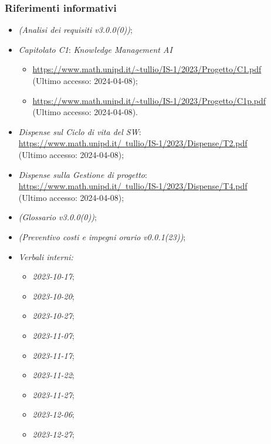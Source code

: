 \documentclass[10pt, a4paper]{article}
\begin{document}
\subsubsection{Riferimenti informativi}
\begin{itemize}
    \item \textit{(Analisi dei requisiti v3.0.0(0))};
    \item \textit{Capitolato C1}: \textit{Knowledge Management AI}
    \begin{itemize}
        \item \url{https://www.math.unipd.it/~tullio/IS-1/2023/Progetto/C1.pdf}\\
        (Ultimo accesso: 2024-04-08);
        \item \url{https://www.math.unipd.it/~tullio/IS-1/2023/Progetto/C1p.pdf}\\
        (Ultimo accesso: 2024-04-08).
    \end{itemize}
    \item \textit{Dispense sul Ciclo di vita del SW\pg}:\\
    \href{https://www.math.unipd.it/~tullio/IS-1/2023/Dispense/T2.pdf}{https://www.math.unipd.it/~tullio/IS-1/2023/Dispense/T2.pdf}\\
    (Ultimo accesso: 2024-04-08);
    \item  \textit{Dispense sulla Gestione di progetto}:\\
    \href{https://www.math.unipd.it/~tullio/IS-1/2023/Dispense/T4.pdf}{https://www.math.unipd.it/~tullio/IS-1/2023/Dispense/T4.pdf}\\
    (Ultimo accesso: 2024-04-08);
    \item \textit{(Glossario v3.0.0(0))};
    \item \textit{(Preventivo costi e impegni orario v0.0.1(23))};
    \item \textit{Verbali interni:}
    \begin{itemize}
        \item \textit{2023-10-17};
        \item \textit{2023-10-20};
        \item \textit{2023-10-27};
        \item \textit{2023-11-07};
        \item \textit{2023-11-17};
        \item \textit{2023-11-22};
        \item \textit{2023-11-27};
        \item \textit{2023-12-06};
        \item \textit{2023-12-27};

\end{itemize}
\end{itemize}
\end{document}
